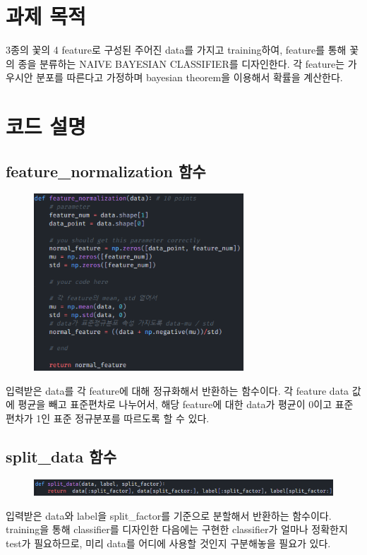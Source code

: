 \documentclass[12pt]{article}
\begin{document}
	
\section{과제 목적}
3종의 꽃의 4 feature로 구성된 주어진 data를 가지고 training하여,
feature를 통해 꽃의 종을 분류하는 NAIVE BAYESIAN CLASSIFIER를 디자인한다.
각 feature는 가우시안 분포를 따른다고 가정하며 bayesian theorem을 이용해서 확률을 계산한다. 

\section{코드 설명}

\subsection{feature\_normalization 함수}
\begin{figure}[h]
	\includegraphics[width=0.7\textwidth]{figures/image01.png}
\end{figure}
입력받은 data를 각 feature에 대해 정규화해서 반환하는 함수이다.
각 feature data 값에 평균을 빼고 표준편차로 나누어서,
해당 feature에 대한 data가 평균이 0이고 표준편차가 1인 표준 정규분포를 따르도록 할 수 있다.

\subsection{split\_data 함수}
\begin{figure}[h]
	\includegraphics[width=\textwidth]{figures/image02.png}
\end{figure}
입력받은 data와 label을 split\_factor를 기준으로 분할해서 반환하는 함수이다.
training을 통해 classifier를 디자인한 다음에는 구현한 classifier가 얼마나 정확한지 test가 필요하므로,
미리 data를 어디에 사용할 것인지 구분해놓을 필요가 있다.
\end{document}
